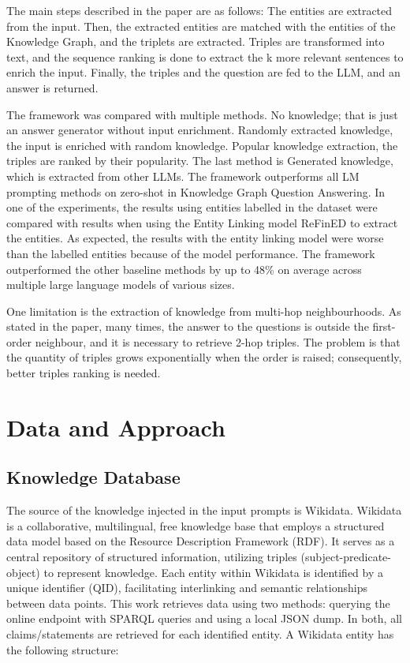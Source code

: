 \documentclass{article}
\begin{document}
The main steps described in the paper are as follows: The entities are extracted from the input. Then, the extracted entities are matched with the entities of the Knowledge Graph, and the triplets are extracted. Triples are transformed into text, and the sequence ranking is done to extract the k more relevant sentences to enrich the input. Finally, the triples and the question are fed to the LLM, and an answer is returned.

The framework was compared with multiple methods. No knowledge; that is just an answer generator without input enrichment. Randomly extracted knowledge, the input is enriched with random knowledge. Popular knowledge extraction, the triples are ranked by their popularity. The last method is Generated knowledge, which is extracted from other LLMs. The framework outperforms all LM prompting methods on zero-shot in Knowledge Graph Question Answering. In one of the experiments, the results using entities labelled in the dataset were compared with results when using the Entity Linking model ReFinED to extract the entities. As expected, the results with the entity linking model were worse than the labelled entities because of the model performance. The framework outperformed the other baseline methods by up to 48\% on average across multiple large language models of various sizes.

One limitation is the extraction of knowledge from multi-hop neighbourhoods. As stated in the paper, many times, the answer to the questions is outside the first-order neighbour, and it is necessary to retrieve 2-hop triples. The problem is that the quantity of triples grows exponentially when the order is raised; consequently, better triples ranking is needed.

\section{Data and Approach}

\subsection{Knowledge Database}

The source of the knowledge injected in the input prompts is Wikidata\cite{wikidata}. Wikidata is a collaborative, multilingual, free knowledge base that employs a structured data model based on the Resource Description Framework (RDF). It serves as a central repository of structured information, utilizing triples (subject-predicate-object) to represent knowledge. Each entity within Wikidata is identified by a unique identifier (QID), facilitating interlinking and semantic relationships between data points. This work retrieves data using two methods: querying the online endpoint with SPARQL queries and using a local JSON dump. In both, all claims/statements are retrieved for each identified entity. A Wikidata entity has the following structure:
\end{document}
